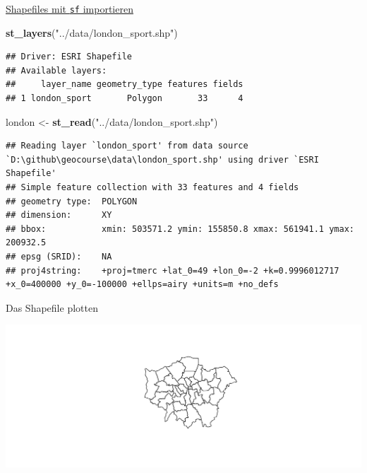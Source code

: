 \documentclass[ignorenonframetext,]{beamer}
\newenvironment{Shaded}{\begin{snugshade}}{\end{snugshade}}
\newcommand{\KeywordTok}[1]{\textcolor[rgb]{0.13,0.29,0.53}{\textbf{#1}}}
\newcommand{\NormalTok}[1]{#1}
\newcommand{\OperatorTok}[1]{\textcolor[rgb]{0.81,0.36,0.00}{\textbf{#1}}}
\newcommand{\StringTok}[1]{\textcolor[rgb]{0.31,0.60,0.02}{#1}}
\begin{document}
\begin{frame}[fragile]{\href{https://cran.r-project.org/web/packages/sf/vignettes/sf2.html}{Shapefiles
mit \texttt{sf} importieren}}
\protect\hypertarget{shapefiles-mit-sf-importieren}{}

\begin{Shaded}
\begin{Highlighting}[]
\KeywordTok{st_layers}\NormalTok{(}\StringTok{"../data/london_sport.shp"}\NormalTok{)}
\end{Highlighting}
\end{Shaded}

\begin{verbatim}
## Driver: ESRI Shapefile 
## Available layers:
##     layer_name geometry_type features fields
## 1 london_sport       Polygon       33      4
\end{verbatim}

\begin{Shaded}
\begin{Highlighting}[]
\NormalTok{london <-}\StringTok{ }\KeywordTok{st_read}\NormalTok{(}\StringTok{"../data/london_sport.shp"}\NormalTok{)}
\end{Highlighting}
\end{Shaded}

\begin{verbatim}
## Reading layer `london_sport' from data source `D:\github\geocourse\data\london_sport.shp' using driver `ESRI Shapefile'
## Simple feature collection with 33 features and 4 fields
## geometry type:  POLYGON
## dimension:      XY
## bbox:           xmin: 503571.2 ymin: 155850.8 xmax: 561941.1 ymax: 200932.5
## epsg (SRID):    NA
## proj4string:    +proj=tmerc +lat_0=49 +lon_0=-2 +k=0.9996012717 +x_0=400000 +y_0=-100000 +ellps=airy +units=m +no_defs
\end{verbatim}

\end{frame}

\begin{frame}[fragile]{Das Shapefile plotten}
\protect\hypertarget{das-shapefile-plotten}{}

\begin{Shaded}
\end{Shaded}

\includegraphics{B7_simplefeatures_files/figure-beamer/unnamed-chunk-6-1.pdf}

\end{frame}
\end{document}
